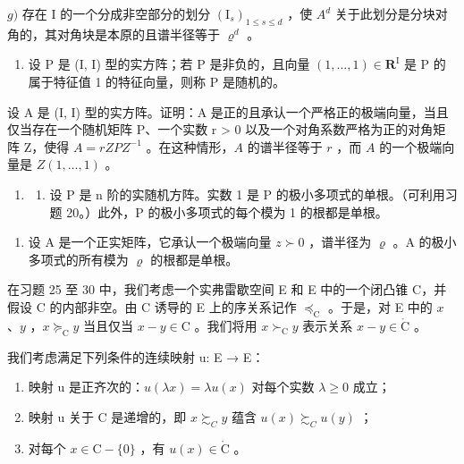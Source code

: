 \(g)\) 存在 I 的一个分成非空部分的划分 \((\mathrm{I}_s)_{1 \leqslant s \leqslant d}\) ，使 \(A^d\) 关于此划分是分块对角的，其对角块是本原的且谱半径等于 \(\varrho^d\) 。

\begin{enumerate}
\def\labelenumi{\arabic{enumi})}
\setcounter{enumi}{22}
\tightlist
\item
  设 P 是 (I, I) 型的实方阵；若 P 是非负的，且向量 \((1, \ldots, 1) \in \mathbf{R}^{\mathrm{I}}\) 是 P 的属于特征值 1 的特征向量，则称 P 是随机的。
\end{enumerate}

设 A 是 (I, I) 型的实方阵。证明：A 是正的且承认一个严格正的极端向量，当且仅当存在一个随机矩阵 P、一个实数 r \textgreater{} 0 以及一个对角系数严格为正的对角矩阵 Z，使得 \(A = rZPZ^{-1}\) 。在这种情形，\(A\) 的谱半径等于 \(r\) ，而 \(A\) 的一个极端向量是 \(Z(1, \ldots, 1)\) 。

\begin{enumerate}
\def\labelenumi{\arabic{enumi})}
\setcounter{enumi}{23}
\tightlist
\item
  \begin{enumerate}
  \def\labelenumii{\alph{enumii})}
  \tightlist
  \item
    设 P 是 n 阶的实随机方阵。实数 1 是 P 的极小多项式的单根。（可利用习题 20。）此外，P 的极小多项式的每个模为 1 的根都是单根。
  \end{enumerate}
\end{enumerate}

\begin{enumerate}
\def\labelenumi{\alph{enumi})}
\setcounter{enumi}{1}
\tightlist
\item
  设 A 是一个正实矩阵，它承认一个极端向量 \(z \succ 0\) ，谱半径为 \(\varrho\) 。A 的极小多项式的所有模为 \(\varrho\) 的根都是单根。
\end{enumerate}

在习题 25 至 30 中，我们考虑一个实弗雷歇空间 E 和 E 中的一个闭凸锥 C，并假设 C 的内部非空。由 C 诱导的 E 上的序关系记作 \(\preccurlyeq_{\mathrm{C}}\) 。于是，对 E 中的 \(x\) 、\(y\) ，\(x \succcurlyeq_{\mathrm{C}} y\) 当且仅当 \(x - y \in \mathrm{C}\) 。我们将用 \(x \succ_{\mathrm{C}} y\) 表示关系 \(x - y \in \mathring{\mathrm{C}}\) 。

我们考虑满足下列条件的连续映射 u: E → E：

\begin{enumerate}
\def\labelenumi{(\roman{enumi})}
\item
  映射 u 是正齐次的：\(u(\lambda x) = \lambda u(x)\) 对每个实数 \(\lambda \geqslant 0\) 成立；
\item
  映射 u 关于 C 是递增的，即 \(x \succsim_{C} y\) 蕴含 \(u(x) \succsim_{C} u(y)\) ；
\item
  对每个 \(x \in \mathrm{C} - \{0\}\) ，有 \(u(x) \in \mathring{\mathrm{C}}\) 。
\end{enumerate}

